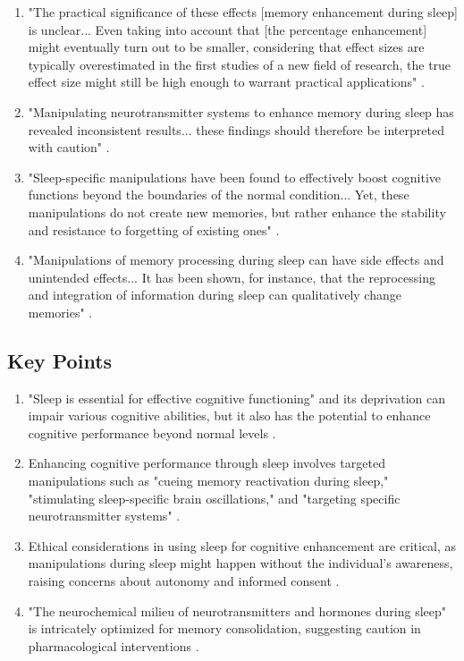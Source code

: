 \begin{enumerate}

	\item "The practical significance of these effects [memory enhancement during sleep] is unclear... Even taking into account that [the percentage enhancement] might eventually turn out to be smaller, considering that effect sizes are typically overestimated in the first studies of a new field of research, the true effect size might still be high enough to warrant practical applications" \parencite{6}.

	\item "Manipulating neurotransmitter systems to enhance memory during sleep has revealed inconsistent results... these findings should therefore be interpreted with caution" \parencite{6}.

  \item "Sleep-specific manipulations have been found to effectively boost cognitive functions beyond the boundaries of the normal condition... Yet, these manipulations do not create new memories, but rather enhance the stability and resistance to forgetting of existing ones" \parencite{6}.

  \item "Manipulations of memory processing during sleep can have side effects and unintended effects... It has been shown, for instance, that the reprocessing and integration of information during sleep can qualitatively change memories" \parencite{6}.

\end{enumerate}

\begin{centering}\subsection{Key Points}\end{centering}

\begin{enumerate}

	\item "Sleep is essential for effective cognitive functioning" and its deprivation can impair various cognitive abilities, but it also has the potential to enhance cognitive performance beyond normal levels \parencite{6}.

	\item Enhancing cognitive performance through sleep involves targeted manipulations such as "cueing memory reactivation during sleep," "stimulating sleep-specific brain oscillations," and "targeting specific neurotransmitter systems" \parencite{6}.

  \item Ethical considerations in using sleep for cognitive enhancement are critical, as manipulations during sleep might happen without the individual's awareness, raising concerns about autonomy and informed consent \parencite{6}.

  \item "The neurochemical milieu of neurotransmitters and hormones during sleep" is intricately optimized for memory consolidation, suggesting caution in pharmacological interventions \parencite{6}.

\end{enumerate}
